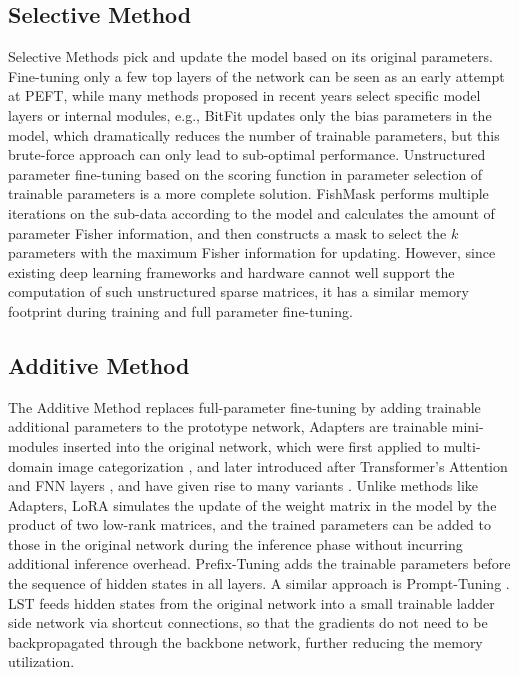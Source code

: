 \subsection{Selective Method} Selective Methods pick and update the model based on its original parameters. Fine-tuning only a few top layers of the network \cite{c:4} can be seen as an early attempt at PEFT, while many methods proposed in recent years select specific model layers \cite{c:9} or internal modules, e.g., BitFit \cite{peft:bitfit} updates only the bias parameters in the model, which dramatically reduces the number of trainable parameters, but this brute-force approach can only lead to sub-optimal performance. Unstructured parameter fine-tuning based on the scoring function in parameter selection of trainable parameters \cite{c:5,c:6,c:7,c:8} is a more complete solution. FishMask \cite{c:10} performs multiple iterations on the sub-data according to the model and calculates the amount of parameter Fisher information, and then constructs a mask to select the $k$ parameters with the maximum Fisher information for updating. However, since existing deep learning frameworks and hardware cannot well support the computation of such unstructured sparse matrices, it has a similar memory footprint during training and full parameter fine-tuning.
\subsection{Additive Method} The Additive Method replaces full-parameter fine-tuning by adding trainable additional parameters to the prototype network, Adapters are trainable mini-modules inserted into the original network, which were first applied to multi-domain image categorization \cite{c:11}, and later introduced after Transformer's Attention and FNN layers \cite{c:12}, and have given rise to many variants \cite{c:13,c:14,c:15}. Unlike methods like Adapters, LoRA \cite{peft:lora} simulates the update of the weight matrix in the model by the product of two low-rank matrices, and the trained parameters can be added to those in the original network during the inference phase without incurring additional inference overhead. Prefix-Tuning \cite{peft:prefix} adds the trainable parameters before the sequence of hidden states in all layers. A similar approach is Prompt-Tuning \cite{c:16}. LST \cite{peft:lst} feeds hidden states from the original network into a small trainable ladder side network via shortcut connections, so that the gradients do not need to be backpropagated through the backbone network, further reducing the memory utilization.
